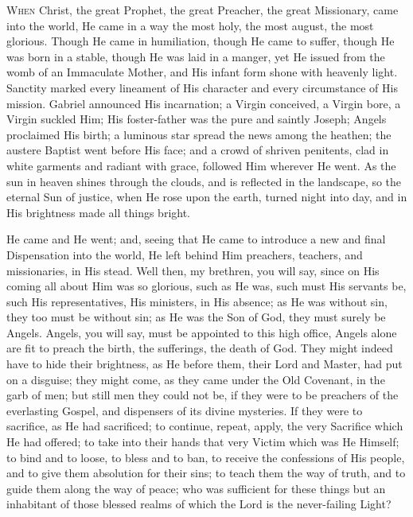 
W\textsc{hen} Christ, the great Prophet, the great Preacher, the great
Missionary, came into the world, He came in a way the most holy, the
most august, the most glorious. Though He came in humiliation, though
He came to suffer, though He was born in a stable, though He was laid
in a manger, yet He issued from the womb of an Immaculate Mother, and
His infant form shone with heavenly light. Sanctity marked every
lineament of His character and every circumstance of His mission.
Gabriel announced His incarnation; a Virgin conceived, a Virgin bore,
a Virgin suckled Him; His foster-father was the pure and saintly
Joseph; Angels proclaimed His birth; a luminous star spread the news
among the heathen; the austere Baptist went before His face; and a
crowd of shriven penitents, clad in white garments and radiant with
grace, followed Him wherever He went. As the sun in heaven shines
through the clouds, and is reflected in the landscape, so the eternal
Sun of justice, when He rose upon the earth, turned night into day,
and in His brightness made all things bright.

He came and He went; and, seeing that He came to introduce a new
and final Dispensation into the world, He left behind Him preachers,
teachers, and missionaries, in His stead. Well then, my brethren, you
will say, since on His coming all about Him was so glorious, such as
He was, such must His servants be, such His representatives, His
ministers, in His absence; as He was without sin, they too must be
without sin; as He was the Son of God, they must surely be Angels.
Angels, you will say, must be appointed to this high office, Angels
alone are fit to preach the birth, the sufferings, the death of God.
They might indeed have to hide their brightness, as He before them,
their Lord and Master, had put on a disguise; they might come, as they
came under the Old Covenant, in the garb of men; but still men they
could not be, if they were to be preachers of the everlasting Gospel,
and dispensers of its divine mysteries. If they were to sacrifice, as
He had sacrificed; to continue, repeat, apply, the very Sacrifice
which He had offered; to take into their hands that very Victim which
was He Himself; to bind and to loose, to bless and to ban, to receive
the confessions of His people, and to give them absolution for their
sins; to teach them the way of truth, and to guide them along the way
of peace; who was sufficient for these things but an inhabitant of
those blessed realms of which the Lord is the never-failing Light?

